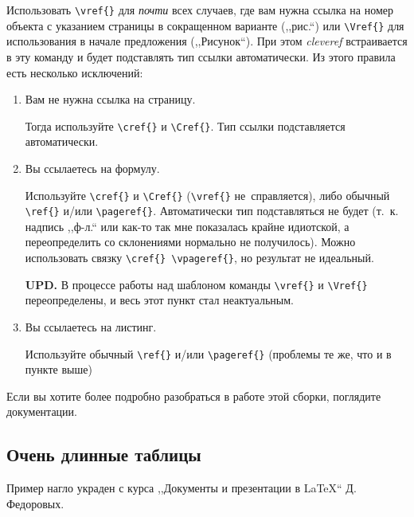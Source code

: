 Использовать \verb|\vref{}| для \emph{почти} всех случаев, где вам нужна ссылка на номер объекта с указанием страницы в сокращенном варианте (,,рис.``) или \verb|\Vref{}| для использования в начале предложения (,,Рисунок``). При этом \emph{cleveref} встраивается в эту команду и будет подставлять тип ссылки автоматически. Из этого правила есть несколько исключений:
\begin{enumerate}
	\item Вам не нужна ссылка на страницу.

	Тогда используйте \verb|\сref{}| и \verb|\Cref{}|. Тип ссылки подставляется автоматически.
	\item Вы ссылаетесь на формулу.

	Используйте \verb|\сref{}| и \verb|\Cref{}| (\verb|\vref{}| не~справляется), либо обычный \verb|\ref{}| и/или \verb|\pageref{}|. Автоматически тип подставляться не будет (т.~к. надпись ,,ф-л.`` или как-то так мне показалась крайне идиотской, а переопределить со склонениями нормально не получилось). Можно использовать связку \verb|\cref{} \vpageref{}|, но результат не идеальный.

	\textbf{UPD.} В процессе работы над шаблоном команды \verb|\vref{}| и \verb|\Vref{}| переопределены, и весь этот пункт стал неактуальным.
	\item Вы ссылаетесь на листинг.

	Используйте обычный \verb|\ref{}| и/или \verb|\pageref{}| (проблемы те же, что и в пункте выше)
\end{enumerate}

Если вы хотите более подробно разобраться в работе этой сборки, поглядите документации.

\subsection{Очень длинные таблицы} \label{subsec:long}
Пример нагло украден с курса ,,Документы и презентации в \LaTeX`` Д. Федоровых.


